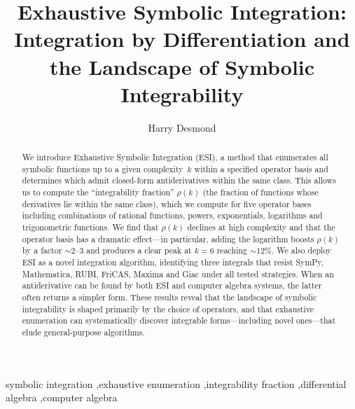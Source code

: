 \documentclass[preprint,12pt,authoryear]{elsarticle}
\newcommand{\Fleq}{\mathcal{F}_{\leq k}}
\newcommand{\rhok}{\rho(k)}
\newcommand{\hd}[1]{{\color{red}\textbf{[HD: #1]}}}
\begin{document}
\begin{frontmatter}

\title{Exhaustive Symbolic Integration: Integration by Differentiation and the Landscape of Symbolic Integrability}

\author[icg]{Harry Desmond}


\begin{abstract}
We introduce Exhaustive Symbolic Integration (ESI), a method that enumerates
all symbolic functions up to a given complexity~$k$ within a specified operator
basis and determines which admit closed-form antiderivatives within the same
class.  This allows us to compute the ``integrability fraction''
$\rhok$
(the fraction of functions whose derivatives lie within the same class), which we compute for five operator bases including combinations of rational functions, powers, exponentials, logarithms and trigonometric functions. We find that $\rhok$ declines at high complexity and that the operator basis has a dramatic effect---in particular, adding the logarithm boosts $\rhok$ by a factor $\sim$2--3 and produces a clear peak at $k=6$ reaching $\sim12\%$.
We also deploy ESI as a novel integration algorithm, identifying three integrals
that resist SymPy, Mathematica, RUBI, FriCAS, Maxima and Giac under all tested strategies.
When an antiderivative can be found by both ESI and computer algebra systems, the latter often returns a simpler form.
These results reveal that the landscape of symbolic integrability is shaped primarily by the choice of operators, and that exhaustive enumeration can systematically discover integrable forms---including novel ones---that elude general-purpose algorithms.
\end{abstract}

\begin{keyword}
symbolic integration \sep exhaustive enumeration \sep integrability fraction \sep differential algebra \sep computer algebra
\end{keyword}

\end{frontmatter}
\end{document}
